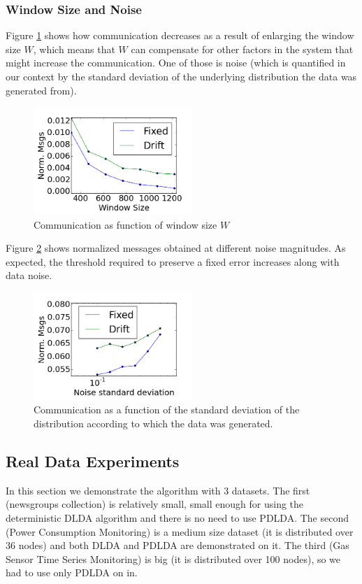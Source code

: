 \documentclass{sig-alternate-05-2015}
\begin{document}
\subsubsection{Window Size and Noise}
Figure \ref{WindowSize} shows how communication decreases as a result
of enlarging the window size $W$, which means that $W$ can compensate for other
factors in the system that might increase the communication. One of those is
noise (which is quantified in our context by the standard deviation of the
underlying distribution the data was generated from).
 \begin{figure}[h]
	\centering
	\includegraphics[width=60mm]{CommunicationOfFixedVsDrift/WindowSize.png}
	\caption{Communication as function of window size $W$}
	\label{WindowSize}
	\end{figure}
Figure \ref{Noise} shows normalized messages obtained at different
noise magnitudes. As expected, the threshold required to preserve a
fixed error increases along with data noise.
\begin{figure}[h]
	\centering
	\includegraphics[width=60mm]{CommunicationOfFixedVsDrift/Noise.png}
	\caption{Communication as a function of the standard deviation of the
	distribution according to which the data was generated.}
	\label{Noise}
	\end{figure}

\subsection{Real Data Experiments}
In this section we demonstrate the algorithm with 3 datasets. The first
(newsgroups collection) is relatively small, small enough for using
the deterministic DLDA algorithm and there is no need to use PDLDA.
The second (Power Consumption Monitoring) is a medium size dataset (it
is distributed over 36 nodes) and both DLDA and PDLDA are demonstrated on it. 
The third (Gas Sensor Time Series Monitoring) is big (it is distributed over
100 nodes), so we had to use only PDLDA on in.
\end{document}
